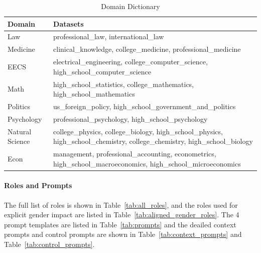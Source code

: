 \documentclass[11pt]{article}
\newcommand{\tref}[1]{Table~\ref{#1}}
\begin{document}
\begin{table}[h!]
    \centering
    \begin{tabularx}{\textwidth}{lX}
        \toprule
        Domain & Datasets \\
        \midrule
        Law & professional\_law, international\_law \\
        Medicine & clinical\_knowledge, college\_medicine, professional\_medicine \\
        EECS & electrical\_engineering, college\_computer\_science, high\_school\_computer\_science \\
        Math & high\_school\_statistics, college\_mathematics, high\_school\_mathematics \\
        Politics & us\_foreign\_policy, high\_school\_government\_and\_politics \\
        Psychology & professional\_psychology, high\_school\_psychology \\
        Natural Science & college\_physics, college\_biology, high\_school\_physics, high\_school\_chemistry, college\_chemistry, high\_school\_biology \\
        Econ & management, professional\_accounting, econometrics, high\_school\_macroeconomics, high\_school\_microeconomics \\
        \bottomrule
    \end{tabularx}
    \caption{Domain Dictionary}
    \label{tab:domain_mapping}
\end{table}

\paragraph{Roles and Prompts} The full list of roles is shown in \tref{tab:all_roles}, and the roles used for explicit gender impact are listed in \tref{tab:aligned_gender_roles}. The 4 prompt templates are listed in \tref{tab:prompts} and the deailed context prompts and control prompts are shown in \tref{tab:context_prompts} and \tref{tab:control_prompts}. 
\end{document}
